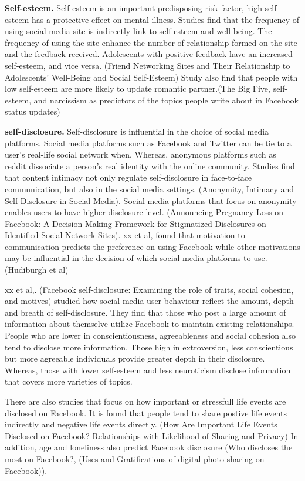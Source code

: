 \textbf{Self-esteem.}
Self-esteem is an important predisposing risk factor, high self-esteem has a protective effect on mental illness. Studies find that the frequency of using social media site is indirectly link to self-esteem and well-being. The frequency of using the site enhance the number of relationship formed on the site and the feedback received. Adolescents with positive feedback have an increased self-esteem, and vice versa. (Friend Networking Sites and Their Relationship to Adolescents’ Well-Being and Social Self-Esteem) Study also find that people with low self-esteem are more likely to update romantic partner.(The Big Five, self-esteem, and narcissism as predictors of the topics people write about in Facebook status updates)


\textbf{self-disclosure.}
Self-disclosure is influential in the choice of social media platforms. Social media platforms such as Facebook and Twitter can be tie to a user's real-life social network when. Whereas, anonymous platforms such as reddit dissociate a person's real identity with the online community. Studies find that content intimacy not only regulate self-disclosure in face-to-face communication, but also in the social media settings.  (Anonymity, Intimacy and Self-Disclosure in Social Media). Social media platforms that focus on anonymity enables users to have higher disclosure level. (Announcing Pregnancy Loss on Facebook: A Decision-Making Framework for Stigmatized Disclosures on Identified Social Network Sites). xx et al, found that motivation to communication predicts the preference on using Facebook while other motivations may be influential in the decision of which social media platforms to use. (Hudiburgh et al) 


xx et al,. (Facebook self-disclosure: Examining the role of traits, social cohesion, and motives) studied how social media user behaviour reflect the amount, depth and breath of self-disclosure. They find that those who post a large amount of information about themselve utilize Facebook to maintain existing relationships.
 People who are lower in conscientiousness, agreeableness and social cohesion also tend to disclose more information. Those high in extroversion, less conscientious but more agreeable individuals provide greater depth in their disclosure. Whereas, those with lower self-esteem and less neuroticism disclose information that covers more varieties of topics.


There are also studies that focus on how important or stressfull life events are disclosed on Facebook. It is found that people tend to share postive life events indirectly and negative life events directly.
(How Are Important Life Events Disclosed on Facebook? Relationships with Likelihood of Sharing and Privacy) In addition, age and loneliness also predict Facebook disclosure (Who discloses the most on Facebook?, (Uses and Gratifications of digital photo sharing on Facebook)).



